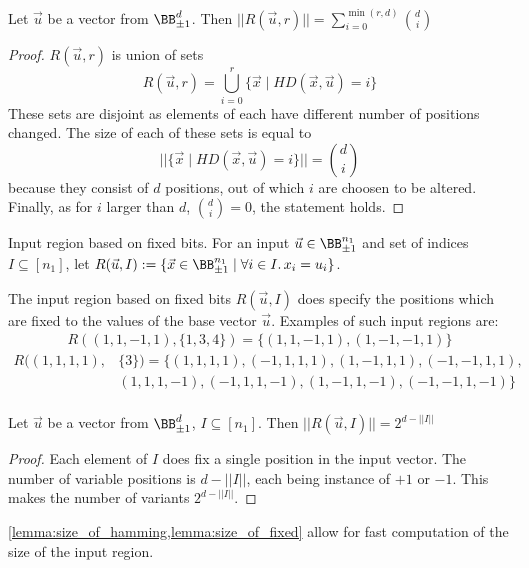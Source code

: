\begin{lemma}{Let $\vec u$ be a vector from $\BB^{d}_{\pm 1}$.
    Then $||R(\vec u, r)|| = \sum_{i=0}^{\min(r, d)} {d\choose i}$}%
    \label{lemma:size_of_hamming}%
    \begin{proof}
        $R(\vec u, r)$ is union of sets
        \begin{equation*}
            R(\vec u, r) = \bigcup_{i=0}^{r} \{\vec x \mid HD(\vec x, \vec u) = i\}
        \end{equation*}
        These sets are disjoint as elements of each have different number
        of positions changed. The size of each of these sets is equal to
        \begin{equation*}
            ||\{\vec x \mid HD(\vec x, \vec u) = i\}|| = {d\choose i}
        \end{equation*}
        because they consist of $d$ positions, out of which $i$ are choosen to be altered.
        Finally, as for $i$ larger than $d$, ${d\choose i}=0$, the statement holds.
    \end{proof}
\end{lemma}

\begin{definition}{Input region based on fixed bits.}
    For an input $\vec u\in \BB^{n_1}_{\pm 1}$ and set of indices $I \subseteq [n_1]$, let
    $R(\vec u, I) := \{\vec x\in \BB^{n_1}_{\pm 1} \mid \forall i\in I.\, x_i = u_i \}$.
\end{definition}

The input region based on fixed bits $R(\vec u, I)$ does specify
the positions which are fixed to the values of the base vector $\vec u$.
Examples of such input regions are:
\begin{align*}
    R((1,1,-1,1), \{1,3,4\}) = \{(1,1,-1,1), (1,-1,-1,1)\}
\end{align*}
\begin{align*}
    R((1,1,1,1), &\{3\}) = \{(1,1,1,1), (-1,1,1,1), (1,-1,1,1), (-1,-1,1,1),\\
    &(1,1,1,-1), (-1,1,1,-1), (1,-1,1,-1), (-1,-1,1,-1)\}\\
\end{align*}

\begin{lemma}{Let $\vec u$ be a vector from $\BB^{d}_{\pm 1}$, $I\subseteq [n_1]$.
    Then $||R(\vec u, I)|| = 2^{d-||I||}$}%
    \label{lemma:size_of_fixed}%
    \begin{proof}
        Each element of $I$ does fix a single position in the input vector.
        The number of variable positions is $d-||I||$, each being instance of
        $+1$ or $-1$. This makes the number of variants $2^{d-||I||}$.
    \end{proof}
\end{lemma}

\begin{remark}
    \cref{lemma:size_of_hamming,lemma:size_of_fixed}
    allow for fast computation of the size of the input region.
\end{remark}


